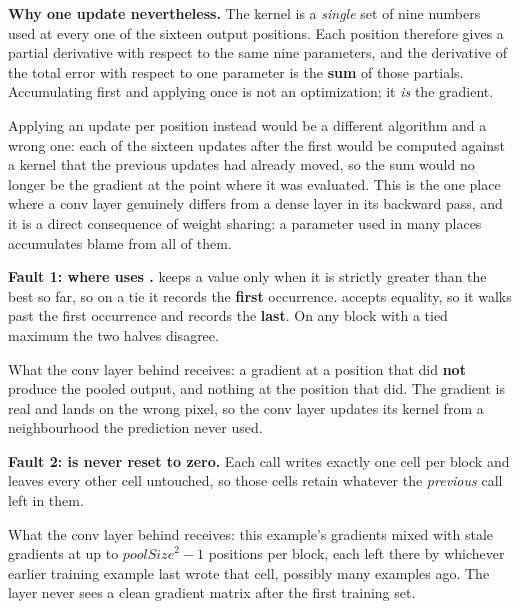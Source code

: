 \textbf{Why one update nevertheless.} The kernel is a \emph{single} set of nine numbers used at
every one of the sixteen output positions. Each position therefore gives a partial derivative with
respect to the same nine parameters, and the derivative of the total error with respect to one
parameter is the \textbf{sum} of those partials. Accumulating first and applying once is not an
optimization; it \emph{is} the gradient. 

Applying an update per position instead would be a different algorithm and a wrong one: each of the
sixteen updates after the first would be computed against a kernel that the previous updates had
already moved, so the sum would no longer be the gradient at the point where it was evaluated. This
is the one place where a conv layer genuinely differs from a dense layer in its backward pass, and
it is a direct consequence of weight sharing: a parameter used in many places accumulates blame from
all of them. 


\textbf{Fault 1: \code{>=} where  uses \code{>}.}  keeps a
value only when it is strictly greater than the best so far, so on a tie it records the
\textbf{first} occurrence.  accepts equality, so it walks past the first
occurrence and records the \textbf{last}. On any block with a tied maximum the two halves disagree.

What the conv layer behind receives: a gradient at a position that did \textbf{not} produce the
pooled output, and nothing at the position that did. The gradient is real and lands on the wrong
pixel, so the conv layer updates its kernel from a neighbourhood the prediction never used.

\textbf{Fault 2:  is never reset to zero.} Each call writes exactly one cell
per block and leaves every other cell untouched, so those cells retain whatever the
\emph{previous} call left in them.

What the conv layer behind receives: this example's gradients mixed with stale gradients at up to
$\mathit{poolSize}^2 - 1$ positions per block, each left there by whichever earlier training example
last wrote that cell, possibly many examples ago. The layer never sees a clean gradient matrix after
the first training set. 

